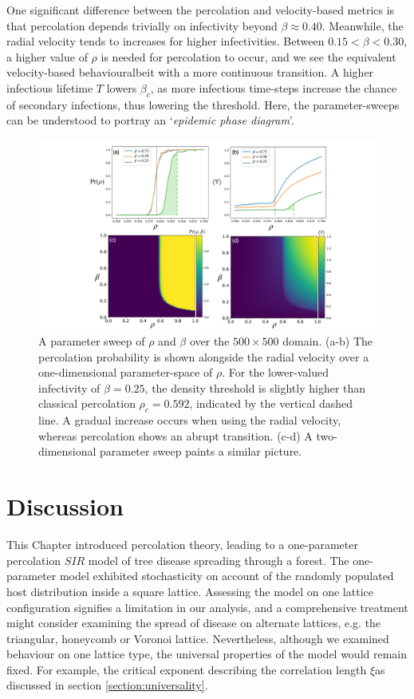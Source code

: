 One significant difference between the percolation and velocity-based metrics is that percolation depends trivially on infectivity beyond $\beta \approx 0.40$.
Meanwhile, the radial velocity tends to increases for higher infectivities.
Between $0.15 <\beta<0.30$, a higher value of $\rho$ is needed for percolation to occur, and
we see the equivalent velocity-based behaviour\textemdash albeit with a more continuous transition.
A higher infectious lifetime $T$ lowers $\beta_c$, as more infectious time-steps increase the chance of secondary infections, thus lowering the threshold.
Here, the parameter-sweeps can be understood to portray an `\textit{epidemic phase diagram}'.

\begin{figure}
    \centering
    \includegraphics[scale=0.325]{chapter3/figures/figure4-perc-vel-phase-trans.pdf}
    \caption{
    A parameter sweep of $\rho$ and $\beta$ over the $500\times500$ domain. (a-b) The percolation probability is shown alongside the radial velocity over a one-dimensional parameter-space of $\rho$. For the lower-valued infectivity of $\beta=0.25$, the density threshold is slightly higher than classical percolation  $\rho_c=0.592$, indicated by the vertical dashed line. A gradual increase occurs when using the radial velocity, whereas percolation shows an abrupt transition. (c-d) A two-dimensional parameter sweep paints a similar picture.
    }
    \label{fig:slm_pspace}
\end{figure}

\newpage

\section{Discussion}

This Chapter introduced percolation theory, leading to a one-parameter percolation $SIR$ model of tree disease spreading through a forest.
The one-parameter model exhibited stochasticity on account of the randomly populated host distribution inside a square lattice. 
Assessing the model on one lattice configuration signifies a limitation in our analysis, and a comprehensive treatment might consider examining the spread of disease on alternate lattices, e.g. the triangular, honeycomb or Voronoi lattice. Nevertheless, although we examined behaviour on one lattice type, the universal properties of the model would remain fixed. For example, the critical exponent describing the correlation length $\xi$\textemdash as discussed in section \ref{section:universality}.


